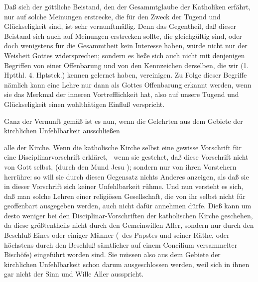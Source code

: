 \begin{aufza}
\item Daß sich der göttliche Beistand, den der Gesammtglaube der Katholiken erfährt, nur auf solche Meinungen erstrecke, die für den Zweck der Tugend und Glückseligkeit  sind, ist sehr vernunftmäßig. Denn das Gegentheil, daß dieser Beistand sich auch auf Meinungen erstrecken sollte, die gleichgültig sind, oder doch wenigstens für die Gesammtheit kein Interesse haben, würde nicht nur der Weisheit Gottes widersprechen; sondern es ließe sich auch nicht mit denjenigen Begriffen von einer Offenbarung und von den Kennzeichen derselben, die wir (1. Hptthl. 4. Hptstck.) kennen gelernet haben, vereinigen. Zu Folge dieser Begriffe nämlich kann eine Lehre nur dann als Gottes Offenbarung erkannt werden, wenn sie das Merkmal der inneren Vortrefflichkeit hat, also auf unsere Tugend und Glückseligkeit einen wohlthätigen Einfluß verspricht.
\item Ganz der Vernunft gemäß ist es nun, wenn die Gelehrten aus dem Gebiete der kirchlichen Unfehlbarkeit ausschließen~
\begin{aufzb}
\item alle  der Kirche. Wenn die katholische Kirche selbst eine gewisse Vorschrift für eine Disciplinarvorschrift erkläret, \dh\ wenn sie gestehet, daß diese Vorschrift nicht von Gott selbst, (durch den Mund Jesu \udgl ); sondern nur von ihren Vorstehern herrühre: so will sie durch diesen Gegensatz nichts Anderes anzeigen, als daß sie in dieser Vorschrift sich keiner Unfehlbarkeit rühme. Und nun versteht es sich, daß man solche Lehren einer religiösen Gesellschaft, die von ihr selbst nicht für geoffenbart ausgegeben werden, auch nicht dafür annehmen dürfe. Dieß kann um desto weniger bei den Disciplinar-Vorschriften der katholischen Kirche geschehen, da diese größtentheils nicht durch den Gemeinwillen Aller, sondern nur durch den Beschluß Eines oder einiger Männer (\zB\ des Papstes und seiner Räthe, oder höchstens durch den Beschluß sämtlicher auf einem Concilium versammelter Bischöfe) eingeführt worden sind. Sie müssen also aus dem Gebiete der kirchlichen Unfehlbarkeit schon darum ausgeschlossen werden, weil sich in ihnen gar nicht der Sinn und Wille Aller ausspricht.\par

\end{aufzb}
\end{aufza}
